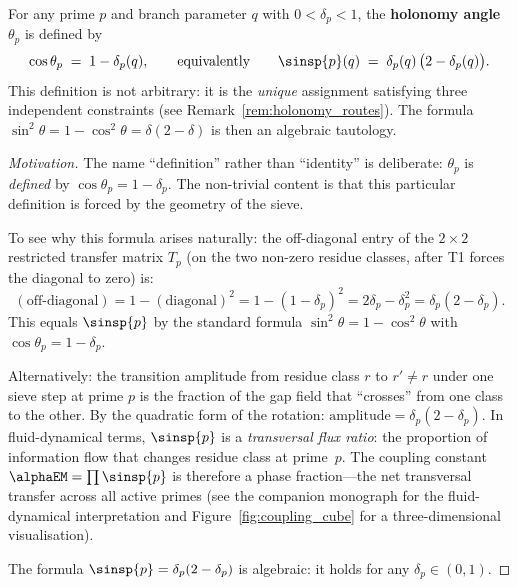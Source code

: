 \documentclass[12pt,a4paper]{article}
\begin{document}
\begin{definition}
\label{def:holonomy}
For any prime $p$ and branch parameter $q$ with $0 < \delta_p < 1$,
the \textbf{holonomy angle} $\theta_p$ is defined by
\begin{equation}
  \cos\theta_p \;=\; 1 - \delta_p(q),
  \qquad\text{equivalently}\qquad
  \sinsp{p}(q) \;=\; \delta_p(q)\,\bigl(2 - \delta_p(q)\bigr).
  \label{eq:holonomy}
\end{equation}
This definition is not arbitrary: it is the \emph{unique} assignment
satisfying three independent constraints (see Remark~\ref{rem:holonomy_routes}).
The formula $\sin^2\theta = 1 - \cos^2\theta = \delta(2-\delta)$
is then an algebraic tautology.

\begin{proof}[Motivation]
The name ``definition'' rather than ``identity'' is deliberate:
$\theta_p$ is \emph{defined} by $\cos\theta_p = 1 - \delta_p$.
The non-trivial content is that this particular definition is
forced by the geometry of the sieve.

To see why this formula arises naturally: the off-diagonal entry of
the $2 \times 2$ restricted transfer matrix $T_p$ (on the two
non-zero residue classes, after T1 forces the diagonal to zero) is:
\[
  (\text{off-diagonal}) = 1 - (\text{diagonal})^2 = 1 - (1 - \delta_p)^2
  = 2\delta_p - \delta_p^2 = \delta_p(2 - \delta_p).
\]
This equals $\sinsp{p}$ by the standard formula $\sin^2\theta = 1 - \cos^2\theta$
with $\cos\theta_p = 1 - \delta_p$.

Alternatively: the transition amplitude from residue class $r$ to
$r' \neq r$ under one sieve step at prime $p$ is the fraction of the
gap field that ``crosses'' from one class to the other. By the quadratic
form of the rotation: $\text{amplitude} = \delta_p(2 - \delta_p)$.
In fluid-dynamical terms, $\sinsp{p}$ is a \emph{transversal flux ratio}:
the proportion of information flow that changes residue class at prime~$p$.
The coupling constant $\alphaEM = \prod\sinsp{p}$ is therefore a
phase fraction---the net transversal transfer across all active primes
(see the companion monograph for the fluid-dynamical interpretation
and Figure~\ref{fig:coupling_cube} for a three-dimensional visualisation).

The formula $\sinsp{p} = \delta_p(2 - \delta_p)$ is algebraic: it
holds for any $\delta_p \in (0,1)$.
\end{proof}
\end{definition}
\end{document}

